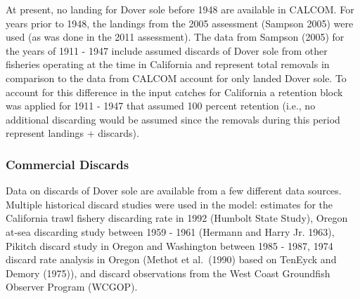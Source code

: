 \documentclass[11pt,
  english,
  a4paper,
]{article}
\begin{document}

At present, no landing for Dover sole before 1948 are available in CALCOM. For years prior to 1948, the landings from the 2005 assessment {(Sampson 2005)\leavevmode\tagmcend\tagstructend} were used (as was done in the 2011 assessment). The data from Sampson {(2005)\leavevmode\tagmcend\tagstructend} for the years of 1911 - 1947 include assumed discards of Dover sole from other fisheries operating at the time in California and represent total removals in comparison to the data from CALCOM account for only landed Dover sole. To account for this difference in the input catches for California a retention block was applied for 1911 - 1947 that assumed 100 percent retention (i.e., no additional discarding would be assumed since the removals during this period represent landings + discards).

\leavevmode\tagmcend\tagstructend\par


\hypertarget{commercial-discards}{%
\subsubsection{Commercial Discards}\label{commercial-discards}}

\leavevmode\tagmcend\tagstructend


Data on discards of Dover sole are available from a few different data sources. Multiple historical discard studies were used in the model: estimates for the California trawl fishery discarding rate in 1992 (Humbolt State Study), Oregon at-sea discarding study between 1959 - 1961 {(Hermann and Harry Jr. 1963)\leavevmode\tagmcend\tagstructend}, Pikitch discard study in Oregon and Washington between 1985 - 1987, 1974 discard rate analysis in Oregon (Methot et al.~{(1990)\leavevmode\tagmcend\tagstructend} based on TenEyck and Demory {(1975)\leavevmode\tagmcend\tagstructend}), and discard observations from the West Coast Groundfish Observer Program (WCGOP).

\leavevmode\tagmcend\tagstructend\par
\end{document}
